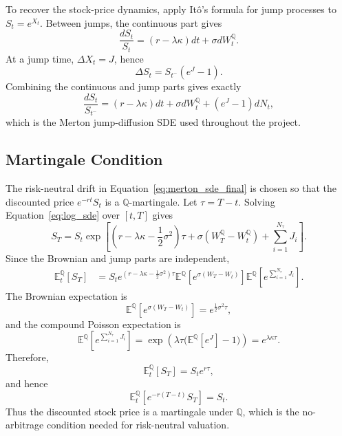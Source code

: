 \documentclass[12pt]{article}
\begin{document}
To recover the stock-price dynamics, apply It\^{o}'s formula for jump processes to $S_t=e^{X_t}$. Between jumps, the continuous part gives
\begin{equation}
\frac{dS_t}{S_t}=
\left(r-\lambda\kappa\right)dt+\sigma dW_t^{\mathbb{Q}}.
\end{equation}
At a jump time, $\Delta X_t=J$, hence
\begin{equation}
\Delta S_t=S_{t^-}(e^J-1).
\end{equation}
Combining the continuous and jump parts gives exactly
\begin{equation}
\frac{dS_t}{S_{t^-}}=
(r-\lambda\kappa)dt+\sigma dW_t^{\mathbb{Q}}+(e^J-1)dN_t,
\label{eq:merton_sde_final}
\end{equation}
which is the Merton jump-diffusion SDE used throughout the project.

\subsection*{Martingale Condition}

The risk-neutral drift in Equation~\eqref{eq:merton_sde_final} is chosen so that the discounted price $e^{-rt}S_t$ is a $\mathbb{Q}$-martingale. Let $\tau=T-t$. Solving Equation~\eqref{eq:log_sde} over $[t,T]$ gives
\begin{equation}
S_T=S_t\exp\left[
\left(r-\lambda\kappa-\frac{1}{2}\sigma^2\right)\tau
+\sigma(W_T^{\mathbb{Q}}-W_t^{\mathbb{Q}})
+\sum_{i=1}^{N_\tau}J_i
\right].
\label{eq:st_solution}
\end{equation}
Since the Brownian and jump parts are independent,
\begin{align}
\mathbb{E}_t^{\mathbb{Q}}[S_T]
&=S_t e^{(r-\lambda\kappa-\frac12\sigma^2)\tau}
\mathbb{E}^{\mathbb{Q}}\!\left[e^{\sigma(W_T-W_t)}\right]
\mathbb{E}^{\mathbb{Q}}\!\left[e^{\sum_{i=1}^{N_\tau}J_i}\right].
\end{align}
The Brownian expectation is
\begin{equation}
\mathbb{E}^{\mathbb{Q}}\!\left[e^{\sigma(W_T-W_t)}\right]
=e^{\frac12\sigma^2\tau},
\end{equation}
and the compound Poisson expectation is
\begin{equation}
\mathbb{E}^{\mathbb{Q}}\!\left[e^{\sum_{i=1}^{N_\tau}J_i}\right]
=\exp\left(\lambda\tau\bigl(\mathbb{E}^{\mathbb{Q}}[e^J]-1\bigr)\right)
=e^{\lambda\kappa\tau}.
\end{equation}
Therefore,
\begin{equation}
\mathbb{E}_t^{\mathbb{Q}}[S_T]=S_t e^{r\tau},
\end{equation}
and hence
\begin{equation}
\mathbb{E}_t^{\mathbb{Q}}\left[e^{-r(T-t)}S_T\right]=S_t.
\label{eq:martingale_result}
\end{equation}
Thus the discounted stock price is a martingale under $\mathbb{Q}$, which is the no-arbitrage condition needed for risk-neutral valuation.
\end{document}

